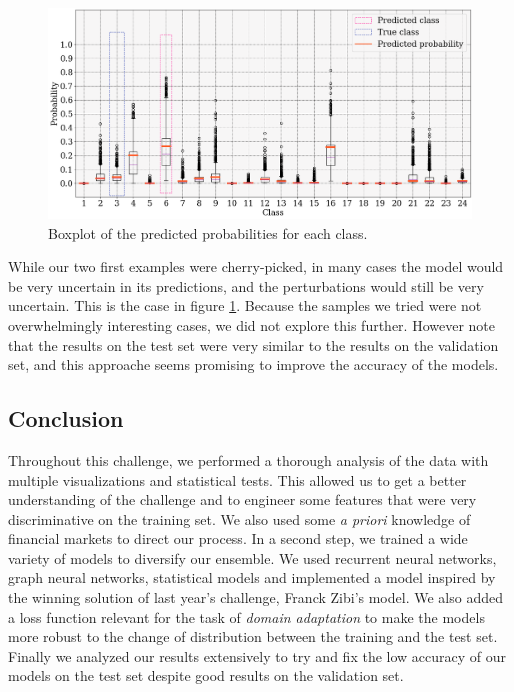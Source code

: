 \documentclass[switch, 11pt]{article}
\begin{document}
\begin{multicols}{2}
\begin{figure}[H]
        \centering
        \includegraphics[width=\columnwidth]{figures/predictions_3.png}
        \caption{Boxplot of the predicted probabilities for each class.}
        \label{fig:predictions_3}
    \end{figure}
    While our two first examples were cherry-picked, in many cases the model would be very uncertain in its predictions, and the perturbations would still be very uncertain. This is the case in figure \ref{fig:predictions_3}. Because the samples we tried were not overwhelmingly interesting cases, we did not explore this further. However note that the results on the test set were very similar to the results on the validation set, and this approache seems promising to improve the accuracy of the models.

    \subsection{Conclusion}
    Throughout this challenge, we performed a thorough analysis of the data with multiple visualizations and statistical tests. This allowed us to get a better understanding of the challenge and to engineer some features that were very discriminative on the training set. We also used some \textit{a priori} knowledge of financial markets to direct our process. In a second step, we trained a wide variety of models to diversify our ensemble. We used recurrent neural networks, graph neural networks, statistical models and implemented a model inspired by the winning solution of last year's challenge, Franck Zibi's model. We also added a loss function relevant for the task of \textit{domain adaptation} to make the models more robust to the change of distribution between the training and the test set. Finally we analyzed our results extensively to try and fix the low accuracy of our models on the test set despite good results on the validation set.


\end{multicols}
\end{document}
